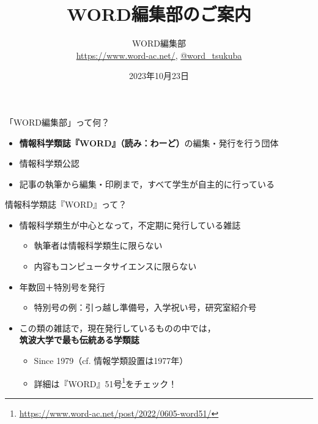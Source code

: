 \documentclass[lualatex]{beamer}
\title{\textbf{WORD編集部のご案内}}
\author{WORD編集部\\\url{https://www.word-ac.net/}, \href{https://twitter.com/word\_tsukuba}{@word\_tsukuba}}
\date{2023年10月23日}   %
\begin{document}
\maketitle
\begin{frame}[plain]{「WORD編集部」って何？}
\begin{itemize}
 \item \alert{\textbf{情報科学類誌『WORD』（読み：わーど）}}の編集・発行を行う団体
 \item 情報科学類公認
 \item 記事の執筆から編集・印刷まで，すべて学生が自主的に行っている
\end{itemize}
\end{frame}
\begin{frame}[plain]{情報科学類誌『WORD』って？}
 \begin{itemize}
  \item 情報科学類生が中心となって，不定期に発行している雑誌
  \begin{itemize}
   \item 執筆者は情報科学類生に限らない
   \item 内容もコンピュータサイエンスに限らない
  \end{itemize}
  \item 年数回＋特別号を発行
  \begin{itemize}
   \item 特別号の例：引っ越し準備号，入学祝い号，研究室紹介号
  \end{itemize}
  \item \alert{この類の雑誌で，現在発行しているものの中では，\\\textbf{筑波大学で最も伝統ある学類誌}}
  \begin{itemize}
   \item Since 1979（cf. 情報学類設置は1977年）
   \item 詳細は『WORD』51号\footnote{\url{https://www.word-ac.net/post/2022/0605-word51/}}をチェック！
  \end{itemize}
 \end{itemize}
\end{frame}
\end{document}

